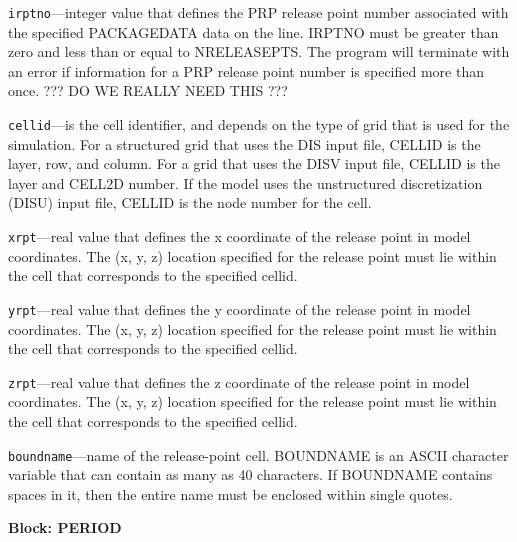 \begin{description}
\item \texttt{irptno}---integer value that defines the PRP release point number associated with the specified PACKAGEDATA data on the line. IRPTNO must be greater than zero and less than or equal to NRELEASEPTS.  The program will terminate with an error if information for a PRP release point number is specified more than once. ??? DO WE REALLY NEED THIS ???

\item \texttt{cellid}---is the cell identifier, and depends on the type of grid that is used for the simulation.  For a structured grid that uses the DIS input file, CELLID is the layer, row, and column.   For a grid that uses the DISV input file, CELLID is the layer and CELL2D number.  If the model uses the unstructured discretization (DISU) input file, CELLID is the node number for the cell.

\item \texttt{xrpt}---real value that defines the x coordinate of the release point in model coordinates.  The (x, y, z) location specified for the release point must lie within the cell that corresponds to the specified cellid.

\item \texttt{yrpt}---real value that defines the y coordinate of the release point in model coordinates.  The (x, y, z) location specified for the release point must lie within the cell that corresponds to the specified cellid.

\item \texttt{zrpt}---real value that defines the z coordinate of the release point in model coordinates.  The (x, y, z) location specified for the release point must lie within the cell that corresponds to the specified cellid.

\item \texttt{boundname}---name of the release-point cell.  BOUNDNAME is an ASCII character variable that can contain as many as 40 characters.  If BOUNDNAME contains spaces in it, then the entire name must be enclosed within single quotes.

\end{description}
\item \textbf{Block: PERIOD}

